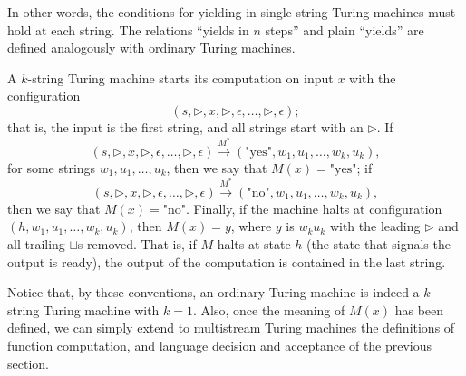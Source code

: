 \documentclass[12pt]{article}
\newcommand{\tr}{\triangleright}
\begin{document}
In other words, the conditions for yielding in single-string Turing machines must hold at each string. The relations ``yields in $n$ steps'' and plain ``yields'' are defined analogously with ordinary Turing machines.

A $k$-string Turing machine starts its computation on input $x$ with the configuration 
\[
(s, \tr, x, \tr, \epsilon, \ldots, \tr, \epsilon);
\]
that is, the input is the first string, and all strings start with an $\tr$. If 
\[
(s, \tr, x, \tr, \epsilon, \ldots, \tr, \epsilon) \xrightarrow{M^*} (\text{"yes"}, w_1, u_1, \ldots, w_k, u_k),
\]
for some strings $w_1, u_1, \ldots, u_k$, then we say that $M(x) = \text{"yes"}$; if 
\[
(s, \tr, x, \tr, \epsilon, \ldots, \tr, \epsilon) \xrightarrow{M^*} (\text{"no"}, w_1, u_1, \ldots, w_k, u_k),
\]
then we say that $M(x) = \text{"no"}$. Finally, if the machine halts at configuration $(h, w_1, u_1, \ldots, w_k, u_k)$, then $M(x) = y$, where $y$ is $w_k u_k$ with the leading $\triangleright$ and all trailing $\sqcup$s removed. That is, if $M$ halts at state $h$ (the state that signals the output is ready), the output of the computation is contained in the last string. 

Notice that, by these conventions, an ordinary Turing machine is indeed a $k$-string Turing machine with $k = 1$. Also, once the meaning of $M(x)$ has been defined, we can simply extend to multistream Turing machines the definitions of function computation, and language decision and acceptance of the previous section.
\end{document}
